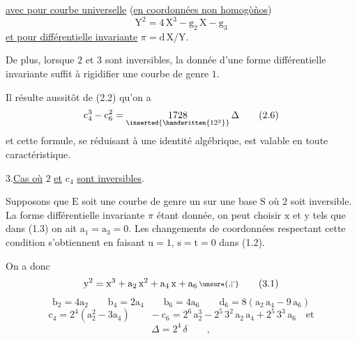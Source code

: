 \uline{avec pour courbe universelle} (\uline{en coordonnées non homogò\`nos})
\[
\mathrm{Y}^{2}=4\,\mathrm{X}^{3}-\mathrm{g}_{2}\,\mathrm{X}-\mathrm{g}_{3}
\]
\uline{et pour différentielle invariante} $\pi=\mathrm{d}\,\mathrm{X}/\mathrm{Y}$.

De plus, lorsque $2$ et $3$ sont inversibles, la donnée d'une forme différentielle invariante suffit à rigidifier une courbe de genre $1$.

Il résulte aussitôt de (2.2) qu'on a
\[
\mathrm{c}_{4}^{3}-\mathrm{c}_{6}^{2}=\underset{\inserted{\handwritten{12^{3}}}}{1728}\,\Delta
\tag*{(2.6)}
\]
et cette formule, se réduisant à une identité algébrique, est valable en toute caractéristique.

3.\qquad \uline{Cas où} $2$ \uline{et} $\mathrm{c}_{4}$ \uline{sont inversibles}.

Supposons que $\mathrm{E}$ soit une courbe de genre un sur une base $\mathrm{S}$ où $2$ soit inversible. La forme différentielle invariante $\pi$ étant donnée, on peut choisir $\mathrm{x}$ et $\mathrm{y}$ tels que dans (1.3) on ait $\mathrm{a}_{1}=\mathrm{a}_{3}=0$. Les changements de coordonnées respectant cette condition s'obtiennent en faisant $\mathrm{u}=1$, $\mathrm{s}=\mathrm{t}=0$ dans (1.2).

On a donc
\[
\mathrm{y}^{2}=\mathrm{x}^{3}+\mathrm{a}_{2}\,\mathrm{x}^{2}+\mathrm{a}_{4}\,\mathrm{x}+\mathrm{a}_{6}\,\raisebox{.14ex}{\scriptsize\unsure{,|'}}
\tag*{(3.1)}
\]
\[
\mathrm{b}_{2}=4\mathrm{a}_{2}\qquad\mathrm{b}_{4}=2\mathrm{a}_{4}\qquad
\mathrm{b}_{6}=4\mathrm{a}_{6}\qquad\mathrm{d}_{6}=8(\mathrm{a}_{2}\,\mathrm{a}_{4}-9\,\mathrm{a}_{6})
\]
\[
\mathrm{c}_{4}=2^{4}(\mathrm{a}_{2}^{2}-3\mathrm{a}_{4})\qquad
-\mathrm{c}_{6}=2^{6}\,\mathrm{a}_{2}^{3}-2^{5}\,3^{2}\,\mathrm{a}_{2}\,\mathrm{a}_{4}+2^{5}\,3^{3}\,\mathrm{a}_{6}\quad\text{et}
\tag*{(3.2)}
\]
\[
\Delta=2^{4}\,\delta\qquad,
\]
\clearpage

